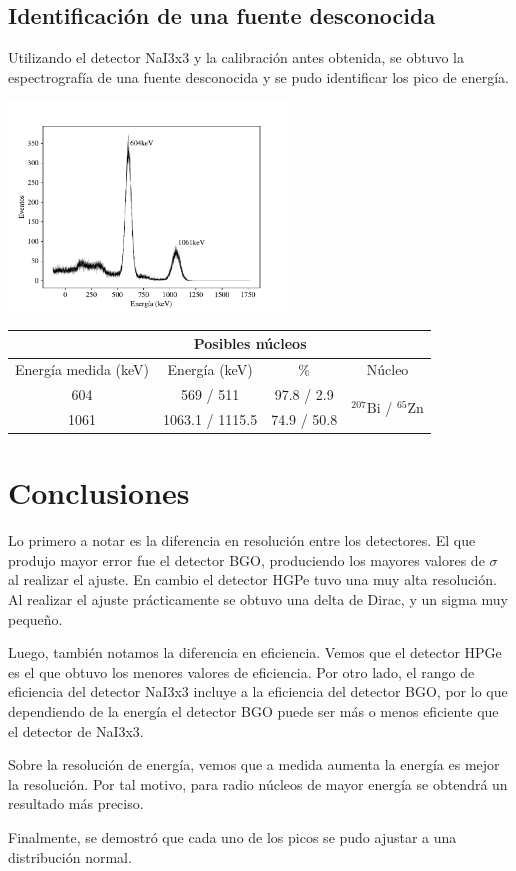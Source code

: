 \documentclass[a4paper, onecolumn]{article}
\begin{document}
		\subsection{Identificación de una fuente desconocida}
		Utilizando el detector NaI3x3 y la calibración antes obtenida, se obtuvo la espectrografía de una fuente desconocida y se pudo identificar los pico de energía.
		\begin{center}
			\includegraphics[width=210pt]{img/unknown_source.pdf}
		\end{center}
		\begin{center}
			{\renewcommand{\arraystretch}{1.5}
			\renewcommand{\tabcolsep}{0.2cm}
			\label{table_energy_resolution}
			\begin{tabular}{ c c c c }
				\hline
				& \multicolumn{2}{c}{Posibles núcleos} \\
				\hline
				Energía medida (keV) & Energía (keV) & \% & Núcleo \\
				\hline
				604 & 569 / 511 & 97.8 / 2.9 & \multirow{2}{*}{${}^{207}\mathrm{Bi}$ / ${}^{65}\mathrm{Zn}$}  \\
				1061 & 1063.1 / 1115.5 & 74.9 / 50.8 &  \\
				\hline
			\end{tabular}}
		\end{center}
	\section{Conclusiones}
		Lo primero a notar es la diferencia en resolución entre los detectores. El que produjo mayor error fue el detector BGO, produciendo los mayores valores de $\sigma$ al realizar el ajuste. En cambio el detector HGPe tuvo una muy alta resolución. Al realizar el ajuste prácticamente se obtuvo una delta de Dirac, y un sigma muy pequeño.

		Luego, también notamos la diferencia en eficiencia. Vemos que el detector HPGe es el que obtuvo los menores valores de eficiencia. Por otro lado, el rango de eficiencia del detector NaI3x3 incluye a la eficiencia del detector BGO, por lo que dependiendo de la energía el detector BGO puede ser más o menos eficiente que el detector de NaI3x3.

		Sobre la resolución de energía, vemos que a medida aumenta la energía es mejor la resolución. Por tal motivo, para radio núcleos de mayor energía se obtendrá un resultado más preciso.

		Finalmente, se demostró que cada uno de los picos se pudo ajustar a una distribución normal.
	
	
\end{document}
